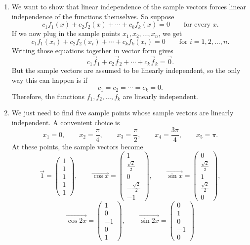 \documentclass[10pt]{extarticle}
\begin{document}
\begin{enumerate}[label=(\alph*)]
\item We want to show that linear independence of the sample vectors forces linear independence of the functions themselves. So suppose
\[
c_1f_1(x)+c_2f_2(x)+\cdots+c_kf_k(x)=0
\qquad \text{for every } x.
\]
If we now plug in the sample points $x_1,x_2,\dots,x_n$, we get
\[
c_1f_1(x_i)+c_2f_2(x_i)+\cdots+c_kf_k(x_i)=0
\qquad \text{for } i=1,2,\dots,n.
\]
Writing those equations together in vector form gives
\[
c_1\vec{f}_1+c_2\vec{f}_2+\cdots+c_k\vec{f}_k=\vec{0}.
\]
But the sample vectors are assumed to be linearly independent, so the only way this can happen is if
\[
c_1=c_2=\cdots=c_k=0.
\]
Therefore, the functions $f_1,f_2,\dots,f_k$ are linearly independent.

\item We just need to find five sample points whose sample vectors are linearly independent. A convenient choice is
\[
x_1=0,\qquad x_2=\frac{\pi}{4},\qquad x_3=\frac{\pi}{2},\qquad x_4=\frac{3\pi}{4},\qquad x_5=\pi.
\]
At these points, the sample vectors become
\[
\vec{1}=
\begin{pmatrix}
1\\1\\1\\1\\1
\end{pmatrix},
\qquad
\vec{\cos x}=
\begin{pmatrix}
1\\[0.2em] \frac{\sqrt{2}}{2}\\[0.2em] 0\\[0.2em] -\frac{\sqrt{2}}{2}\\[0.2em] -1
\end{pmatrix},
\qquad
\vec{\sin x}=
\begin{pmatrix}
0\\[0.2em] \frac{\sqrt{2}}{2}\\[0.2em] 1\\[0.2em] \frac{\sqrt{2}}{2}\\[0.2em] 0
\end{pmatrix},
\]
\[
\vec{\cos 2x}=
\begin{pmatrix}
1\\0\\-1\\0\\1
\end{pmatrix},
\qquad
\vec{\sin 2x}=
\begin{pmatrix}
0\\1\\0\\-1\\0

\end{pmatrix}\]
\end{enumerate}
\end{document}
